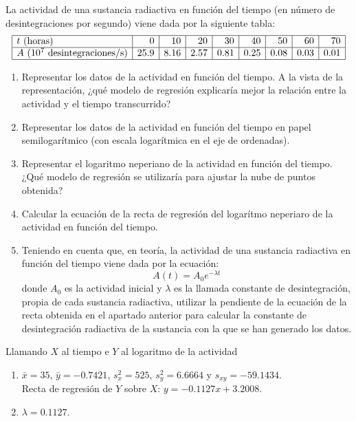 {La actividad de una sustancia radiactiva en función del tiempo (en número de desintegraciones por segundo)
viene dada por la siguiente tabla:
\[
\begin{array}{|l|r|r|r|r|r|r|r|r|}
\hline
t\text{ (horas)} & 0 & 10 & 20 & 30 & 40 & 50 & 60 & 70 \\
\hline
A\text{ ($10^7$ desintegraciones/s)} & 25.9 & 8.16 & 2.57 & 0.81 & 0.25 & 0.08 & 0.03 & 0.01\\
\hline
\end{array}
\]

\begin{enumerate}
\item Representar los datos de la actividad en función del tiempo.
A la vista de la representación, ¿qué modelo de regresión explicaría mejor la relación entre la actividad y el tiempo
transcurrido?
\item Representar los datos de la actividad en función del tiempo en papel semilogarítmico (con escala logarítmica en
el eje de ordenadas).
\item Representar el logaritmo neperiano de la actividad en función del tiempo. ¿Qué modelo de regresión se utilizaría
para ajustar la nube de puntos obtenida?
\item Calcular la ecuación de la recta de regresión del logarítmo neperiaro de la actividad en función del tiempo.
\item Teniendo en cuenta que, en teoría, la actividad de una sustancia radiactiva en función del tiempo viene dada por
la ecuación:
\[
A(t) = A_0 e^{ - \lambda t}
\]
donde $A_0$ es la actividad inicial y $\lambda$ es la llamada constante de desintegración, propia de cada sustancia
radiactiva, utilizar la pendiente de la ecuación de la recta obtenida en el apartado anterior para calcular la
constante de desintegración radiactiva de la sustancia con la que se han generado los datos.
\end{enumerate}
}
{Llamando $X$ al tiempo e $Y$ al logaritmo de la actividad
\begin{enumerate}[start=4]
\item $\bar x=35$, $\bar y=-0.7421$, $s_x^2=525$, $s_y^2=6.6664$ y $s_{xy}=-59.1434$.\\
Recta de regresión de $Y$ sobre $X$: $y=-0.1127x+3.2008$.
\item $\lambda=0.1127$.
\end{enumerate}
}
{}


